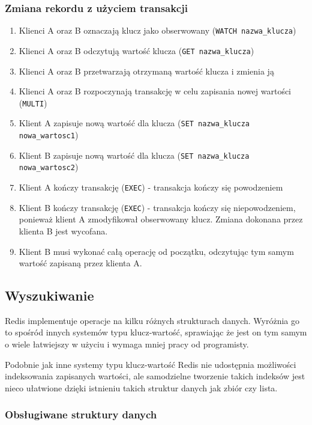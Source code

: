 \subsubsection*{Zmiana rekordu z użyciem transakcji}

\begin{enumerate}
 \item Klienci A oraz B oznaczają klucz jako obserwowany (\verb+WATCH nazwa_klucza+)
 \item Klienci A oraz B odczytują wartość klucza (\verb+GET nazwa_klucza+)
 \item Klienci A oraz B przetwarzają otrzymaną wartość klucza i zmienia ją
 \item Klienci A oraz B rozpoczynają transakcję w celu zapisania nowej wartości (\verb+MULTI+)
 \item Klient A zapisuje nową wartość dla klucza (\verb+SET nazwa_klucza nowa_wartosc1+)
 \item Klient B zapisuje nową wartość dla klucza (\verb+SET nazwa_klucza nowa_wartosc2+)
 \item Klient A kończy transakcję (\verb+EXEC+) - transakcja kończy się powodzeniem
 \item Klient B kończy transakcję (\verb+EXEC+) - transakcja kończy się niepowodzeniem, ponieważ klient A zmodyfikował obserwowany klucz.
 Zmiana dokonana przez klienta B jest wycofana.
 \item Klient B musi wykonać całą operację od początku, odczytując tym samym wartość zapisaną przez klienta A.
\end{enumerate}

\subsection*{Wyszukiwanie}

Redis implementuje operacje na kilku różnych strukturach danych.
Wyróżnia go to spośród innych systemów typu klucz-wartość, sprawiając że jest on tym samym o wiele łatwiejszy w użyciu i wymaga mniej pracy od programisty.

Podobnie jak inne systemy typu klucz-wartość Redis nie udostępnia możliwości indeksowania zapisanych wartości, ale samodzielne tworzenie takich indeksów jest nieco ułatwione dzięki istnieniu takich struktur danych jak zbiór czy lista.

\subsubsection*{Obsługiwane struktury danych}

